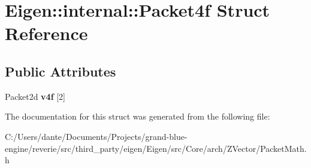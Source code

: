 \hypertarget{struct_eigen_1_1internal_1_1_packet4f}{}\section{Eigen\+::internal\+::Packet4f Struct Reference}
\label{struct_eigen_1_1internal_1_1_packet4f}
\subsection*{Public Attributes}
\begin{DoxyCompactItemize}
\item 
\mbox{\label{struct_eigen_1_1internal_1_1_packet4f_a68a71523e74ff07b73502f2bab028684}} 
Packet2d {\bfseries v4f} \mbox{[}2\mbox{]}
\end{DoxyCompactItemize}


The documentation for this struct was generated from the following file\+:\begin{DoxyCompactItemize}
\item 
C\+:/\+Users/dante/\+Documents/\+Projects/grand-\/blue-\/engine/reverie/src/third\+\_\+party/eigen/\+Eigen/src/\+Core/arch/\+Z\+Vector/Packet\+Math.\+h\end{DoxyCompactItemize}
